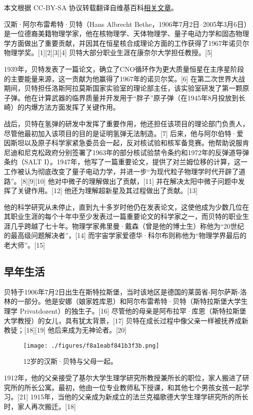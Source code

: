 
本文根据 CC-BY-SA 协议转载翻译自维基百科\href{https://en.wikipedia.org/wiki/Hans_Bethe#Honors_and_awards}{相关文章}。


汉斯·阿尔布雷希特·贝特（Hans Albrecht Bethe，1906年7月2日–2005年3月6日）是一位德裔美籍物理学家，他在核物理学、天体物理学、量子电动力学和固态物理学方面做出了重要贡献，并因其在恒星核合成理论方面的工作获得了1967年诺贝尔物理学奖。[1][2][3][4] 贝特大部分职业生涯在康奈尔大学担任教授。[5]

1939年，贝特发表了一篇论文，确立了CNO循环作为更大质量恒星在主序星阶段的主要能量来源，这一贡献为他赢得了1967年的诺贝尔奖。[6] 在第二次世界大战期间，贝特担任洛斯阿拉莫斯国家实验室的理论部主任，该实验室研发了第一颗原子弹。他在计算武器的临界质量并开发用于“胖子”原子弹（在1945年8月投放到长崎）的内爆方法方面发挥了关键作用。

战后，贝特在氢弹的研发中发挥了重要作用，他还担任该项目的理论部门负责人，尽管他最初加入该项目的目的是证明氢弹无法制造。[7] 后来，他与阿尔伯特·爱因斯坦以及原子科学家紧急委员会一起，反对核试验和核军备竞赛。他帮助说服肯尼迪和尼克松政府分别签署了1963年的部分核试验禁令条约和1972年的反弹道导弹条约（SALT I）。1947年，他写了一篇重要论文，提供了对兰姆位移的计算，这一工作被认为彻底改变了量子电动力学，并进一步“为现代粒子物理学时代开辟了道路”。[8][9][10] 他对中微子的理解做出了贡献，[11] 并在解决太阳中微子问题中发挥了关键作用。[12] 他还为理解超新星及其过程做出了贡献。[13]

他的科学研究从未停止，直到九十多岁时他仍在发表论文，这使他成为少数几位在其职业生涯的每个十年中至少发表过一篇重要论文的科学家之一，而贝特的职业生涯几乎跨越了七十年。物理学家弗里曼·戴森（曾是他的博士生）称他为“20世纪的最高级问题解决者”，[14] 而宇宙学家爱德华·科尔布则称他为“物理学界最后的老大师”。[15]
\subsection{早年生活}  
贝特于1906年7月2日出生在斯特拉斯堡，当时该地区是德国的莱茵省-阿尔萨斯-洛林的一部分。他是安娜（娘家姓库恩）和阿尔布雷希特·贝特（斯特拉斯堡大学生理学 Privatdozent）的独生子。[16] 尽管他的母亲是阿布拉罕·库恩（斯特拉斯堡大学教授）的女儿，具有犹太背景，[17] 贝特在成长过程中像父亲一样被抚养成新教徒；[18][19] 他后来成为无神论者。[20]
\begin{figure}[ht]
\centering
\texttt{[image: ./figures/f8a1eabf841b3f3b.png]}
\caption{12岁的汉斯·贝特与父母一起。} \label{fig_Hans_1}
\end{figure}
1912年，他的父亲接受了基尔大学生理学研究所教授兼所长的职位，家人搬进了研究所的所长公寓。最初，他由一位专业教师私下授课，和其他七个男孩女孩一起学习。[21] 1915年，当他的父亲成为新成立的法兰克福歌德大学生理学研究所的所长时，家人再次搬迁。[18]

